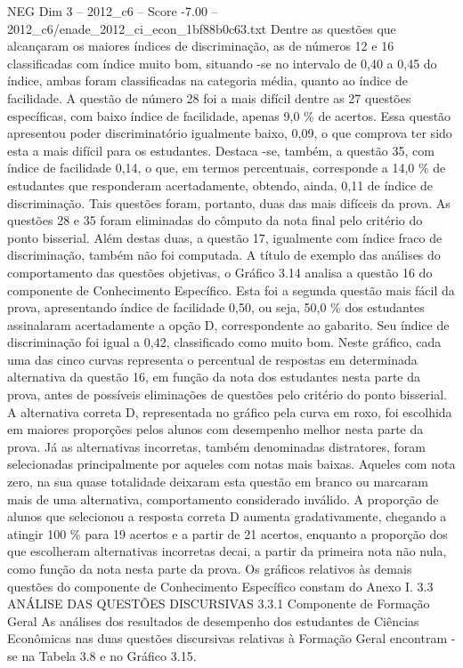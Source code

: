 \begin{textsample}{NEG Dim 3 – 2012\_c6 – Score -7.00 – 2012\_c6/enade\_2012\_ci\_econ\_1bf88b0c63.txt}
Dentre as questões que alcançaram os maiores índices de discriminação, as de números 12 e 16 classificadas com índice muito bom, situando -se no intervalo de 0,40 a 0,45 do índice, ambas foram classificadas na categoria média, quanto ao índice de facilidade.
A questão de número 28 foi a mais difícil dentre as 27 questões específicas, com baixo índice de facilidade, apenas 9,0 \% de acertos.
Essa questão apresentou poder discriminatório igualmente baixo, 0,09, o que comprova ter sido esta a mais difícil para os estudantes.
Destaca -se, também, a questão 35, com índice de facilidade 0,14, o que, em termos percentuais, corresponde a 14,0 \% de estudantes que responderam acertadamente, obtendo, ainda, 0,11 de índice de discriminação.
Tais questões foram, portanto, duas das mais difíceis da prova.
As questões 28 e 35 foram eliminadas do cômputo da nota final pelo critério do ponto bisserial.
Além destas duas, a questão 17, igualmente com índice fraco de discriminação, também não foi computada.
A título de exemplo das análises do comportamento das questões objetivas, o Gráfico 3.14 analisa a questão 16 do componente de Conhecimento Específico.
Esta foi a segunda questão mais fácil da prova, apresentando índice de facilidade 0,50, ou seja, 50,0 \% dos estudantes assinalaram acertadamente a opção D, correspondente ao gabarito.
Seu índice de discriminação foi igual a 0,42, classificado como muito bom.
Neste gráfico, cada uma das cinco curvas representa o percentual de respostas em determinada alternativa da questão 16, em função da nota dos estudantes nesta parte da prova, antes de possíveis eliminações de questões pelo critério do ponto bisserial.
A alternativa correta D, representada no gráfico pela curva em roxo, foi escolhida em maiores proporções pelos alunos com desempenho melhor nesta parte da prova.
Já as alternativas incorretas, também denominadas distratores, foram selecionadas principalmente por aqueles com notas mais baixas.
Aqueles com nota zero, na sua quase totalidade deixaram esta questão em branco ou marcaram mais de uma alternativa, comportamento considerado inválido.
A proporção de alunos que selecionou a resposta correta D aumenta gradativamente, chegando a atingir 100 \% para 19 acertos e a partir de 21 acertos, enquanto a proporção dos que escolheram alternativas incorretas decai, a partir da primeira nota não nula, como função da nota nesta parte da prova.
Os gráficos relativos às demais questões do componente de Conhecimento Específico constam do Anexo I. 3.3 ANÁLISE DAS QUESTÕES DISCURSIVAS 3.3.1 Componente de Formação Geral As análises dos resultados de desempenho dos estudantes de Ciências Econômicas nas duas questões discursivas relativas à Formação Geral encontram -se na Tabela 3.8 e no Gráfico 3.15.

\end{textsample}
